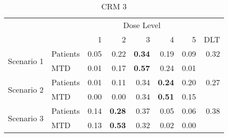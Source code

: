 \documentclass[12pt]{article}
\begin{document}
\begin{table}[ht]
\begin{center}
\begin{tabular}{llrrrrrr}
\hline\hline
& & \multicolumn{5}{c}{Dose Level} & \\
& & 1 & 2 & 3 & 4 & 5 & DLT \\  \hline
\multirow{2}{*}{Scenario 1} & Patients    & 0.05 & 0.22 & \textbf{0.34} & 0.19 & 0.09 & 0.32 \\
                            & MTD         & 0.01 & 0.17 & \textbf{0.57} & 0.24 & 0.01 &      \\
\multirow{2}{*}{Scenario 2} & Patients    & 0.01 & 0.11 & 0.34 & \textbf{0.24} & 0.20 & 0.27 \\
                            & MTD         & 0.00 & 0.00 & 0.34 & \textbf{0.51} & 0.15 &      \\
\multirow{2}{*}{Scenario 3} & Patients    & 0.14 & \textbf{0.28} & 0.37 & 0.05 & 0.06 & 0.38 \\
                            & MTD         & 0.13 & \textbf{0.53} & 0.32 & 0.02 & 0.00 &      \\
\hline\hline
\end{tabular}
\caption{CRM 3}
\end{center}
\end{table}
\end{document}
